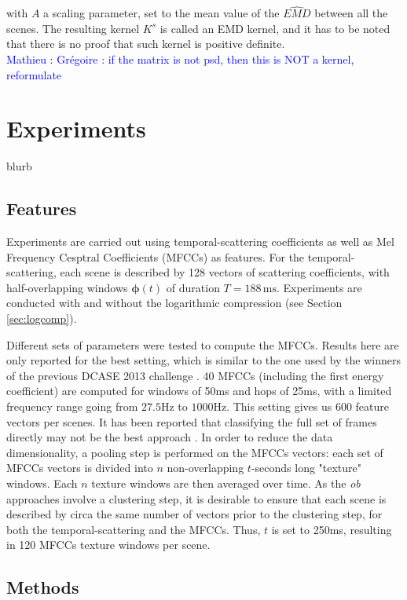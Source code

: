 \documentclass[journal]{IEEEtran}
\newcommand{\ml}[1]{\textcolor{blue}{ Mathieu : #1}}
\begin{document}
with $A$ a scaling parameter, set to the mean value of the $\widehat{EMD}$ between all the scenes. The resulting kernel $K^s$ is called an EMD kernel, and it has to be noted that there is no proof that such kernel is positive definite. \\

\ml{Grégoire : if the matrix is not psd, then this is NOT a kernel, reformulate}

\section{Experiments}
\label{sec:ExpEval}

blurb

\subsection{Features}

Experiments are carried out using temporal-scattering coefficients as well as Mel Frequency Cesptral Coefficients (MFCCs) as features. For the temporal-scattering, each scene is described by 128 vectors of scattering coefficients, with half-overlapping windows $\boldsymbol{\phi}(t)$ of duration $T=188\,\mathrm{ms}$. Experiments are conducted with and without the logarithmic compression (see Section \ref{sec:logcomp}).

Different sets of parameters were tested to compute the MFCCs. Results here are only reported for the best setting, which is similar to the one used by the winners of the previous DCASE 2013 challenge \cite{roma2013}. 40 MFCCs (including the first energy coefficient) are computed for windows of 50ms and hops of 25ms, with a limited frequency range going from $27.5$Hz to $1000$Hz. This setting gives us 600 feature vectors per scenes. It has been reported that classifying the full set of frames directly may not be the best approach \cite{rakotomamonjy2015histogram}. In order to reduce the data dimensionality, a pooling step is performed on the MFCCs vectors: each set of MFCCs vectors is divided into $n$ non-overlapping $t$-seconds long "texture" windows. Each $n$ texture windows are then averaged over time. As the \emph{ob} approaches involve a clustering step, it is desirable to ensure that each scene is described by circa the same number of vectors prior to the clustering step, for both the temporal-scattering and the MFCCs. Thus, $t$ is set to 250ms, resulting in 120 MFCCs texture windows per scene. 

\subsection{Methods}
\end{document}
